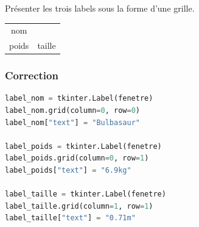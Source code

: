 \documentclass[svgnames,11pt]{beamer}
\begin{document}
\begin{frame}
    \frametitle{}
    \begin{activite}
        Présenter les trois labels sous la forme d'une grille.
        \begin{center}
            \begin{tabular}{cc}
                nom   &        \\
                poids & taille \\
            \end{tabular}
        \end{center}
    \end{activite}


\end{frame}

\begin{frame}[fragile]
    \frametitle{Correction}

    \begin{center}
        \begin{lstlisting}[language=Python, basicstyle=\small]
label_nom = tkinter.Label(fenetre)
label_nom.grid(column=0, row=0)
label_nom["text"] = "Bulbasaur"

label_poids = tkinter.Label(fenetre)
label_poids.grid(column=0, row=1)
label_poids["text"] = "6.9kg"

label_taille = tkinter.Label(fenetre)
label_taille.grid(column=1, row=1)
label_taille["text"] = "0.71m"
\end{lstlisting}
        \label{CODE}
    \end{center}

\end{frame}
\end{document}
